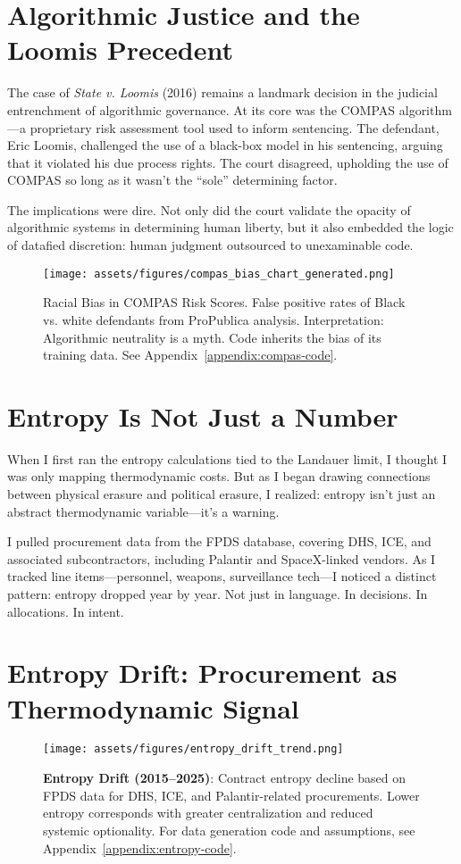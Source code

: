 \section{Algorithmic Justice and the Loomis Precedent}
The case of \textit{State v. Loomis} (2016) remains a landmark decision in the judicial entrenchment of algorithmic governance. At its core was the COMPAS algorithm—a proprietary risk assessment tool used to inform sentencing. The defendant, Eric Loomis, challenged the use of a black-box model in his sentencing, arguing that it violated his due process rights. The court disagreed, upholding the use of COMPAS so long as it wasn't the \enquote{sole} determining factor.

The implications were dire. Not only did the court validate the opacity of algorithmic systems in determining human liberty, but it also embedded the logic of datafied discretion: human judgment outsourced to unexaminable code.

\begin{figure}[H]
  \centering
  \texttt{[image: assets/figures/compas\_bias\_chart\_generated.png]}
  \caption{Racial Bias in COMPAS Risk Scores. False positive rates of Black vs. white defendants from ProPublica analysis. Interpretation: Algorithmic neutrality is a myth. Code inherits the bias of its training data. See Appendix~\ref{appendix:compas-code}.}
\end{figure}

\section*{Entropy Is Not Just a Number}
When I first ran the entropy calculations tied to the Landauer limit, I thought I was only mapping thermodynamic costs. But as I began drawing connections between physical erasure and political erasure, I realized: entropy isn't just an abstract thermodynamic variable—it's a warning.

I pulled procurement data from the FPDS database, covering DHS, ICE, and associated subcontractors, including Palantir and SpaceX-linked vendors. As I tracked line items—personnel, weapons, surveillance tech—I noticed a distinct pattern: entropy dropped year by year. Not just in language. In decisions. In allocations. In intent.

\section*{Entropy Drift: Procurement as Thermodynamic Signal}
\begin{figure}[H]
  \centering
  \texttt{[image: assets/figures/entropy\_drift\_trend.png]}
  \caption{\textbf{Entropy Drift (2015–2025)}: Contract entropy decline based on FPDS data for DHS, ICE, and Palantir-related procurements. Lower entropy corresponds with greater centralization and reduced systemic optionality. For data generation code and assumptions, see Appendix~\ref{appendix:entropy-code}.}
  \label{fig:entropy_drift}
\end{figure}

